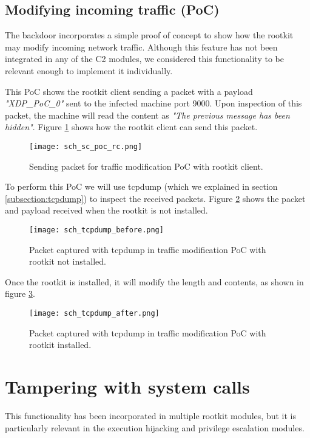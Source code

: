 \subsection{Modifying incoming traffic (PoC)}
The backdoor incorporates a simple proof of concept to show how the rootkit may modify incoming network traffic. Although this feature has not been integrated in any of the C2 modules, we considered this functionality to be relevant enough to implement it individually.

This PoC shows the rootkit client sending a packet with a payload \textit{"XDP\_PoC\_0"} sent to the infected machine port 9000. Upon inspection of this packet, the machine will read the content as \textit{"The previous message has been hidden"}. Figure \ref{fig:sc_poc_rc} shows how the rootkit client can send this packet.

\begin{figure}[htbp]
	\centering
	\texttt{[image: sch\_sc\_poc\_rc.png]}
	\caption{Sending packet for traffic modification PoC with rootkit client.}
	\label{fig:sc_poc_rc}
\end{figure}

To perform this PoC we will use tcpdump (which we explained in section \ref{subsection:tcpdump}) to inspect the received packets. Figure \ref{fig:sc_tcpdump_before} shows the packet and payload received when the rootkit is not installed.

\begin{figure}[htbp]
	\centering
	\texttt{[image: sch\_tcpdump\_before.png]}
	\caption{Packet captured with tcpdump in traffic modification PoC with rootkit not installed.}
	\label{fig:sc_tcpdump_before}
\end{figure}

Once the rootkit is installed, it will modify the length and contents, as shown in figure \ref{fig:sc_tcpdump_after}.

\begin{figure}[htbp]
	\centering
	\texttt{[image: sch\_tcpdump\_after.png]}
	\caption{Packet captured with tcpdump in traffic modification PoC with rootkit installed.}
	\label{fig:sc_tcpdump_after}
\end{figure}


\section{Tampering with system calls}
This functionality has been incorporated in multiple rootkit modules, but it is particularly relevant in the execution hijacking and privilege escalation modules.

